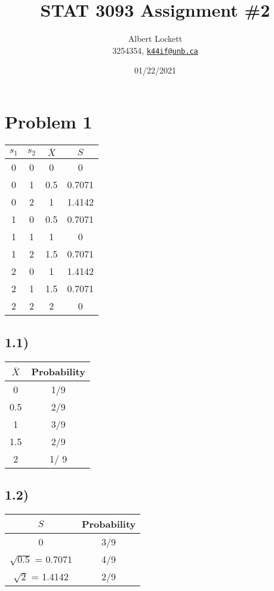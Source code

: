 \documentclass[a4paper,11pt]{article}
\begin{document}
\title{STAT 3093 Assignment \#2}
\author{
  Albert Lockett \\ 
  3254354, 
  \href{mailto:me@somewhere.com}{\texttt{k44if@unb.ca}}
  }
\date{01/22/2021}

\section*{Problem 1}

\begin{table}[htbp]
  \begin{tabularx}{\textwidth}{cccc}
    {\bf $s_1$} & {\bf $s_2$} & {\bf $\bar{X}$} & {\bf $S$} \\ \hline
    0 & 0 &     0      & 0      \\ 
    0 & 1 &    0.5     & 0.7071 \\ 
    0 & 2 &     1      & 1.4142 \\ 
    1 & 0 &    0.5     & 0.7071 \\ 
    1 & 1 &     1      & 0      \\ 
    1 & 2 &    1.5     & 0.7071 \\ 
    2 & 0 &     1      & 1.4142 \\ 
    2 & 1 &    1.5     & 0.7071 \\ 
    2 & 2 &     2      & 0          
  \end{tabularx}
\end{table}

\subsection*{1.1)}

\begin{table}[htbp]
  \begin{tabularx}{\textwidth}{cc}
    {\bf $\bar{X}$} & Probability \\ \hline
    0 & 1/9 \\ 
    0.5 & 2/9 \\
    1 &  3/9 \\
    1.5 & 2/9 \\
    2 & 1/ 9\\
  \end{tabularx}
\end{table}

\subsection*{1.2)}

\begin{table}[htbp]
  \begin{tabularx}{\textwidth}{cc}
    {\bf $S$} & Probability \\ \hline
    0 & 3/9 \\ 
    $\sqrt{0.5}$ = 0.7071 & 4/9 \\
    $\sqrt{2}$ = 1.4142 &  2/9 \\
  \end{tabularx}
\end{table}
\end{document}
